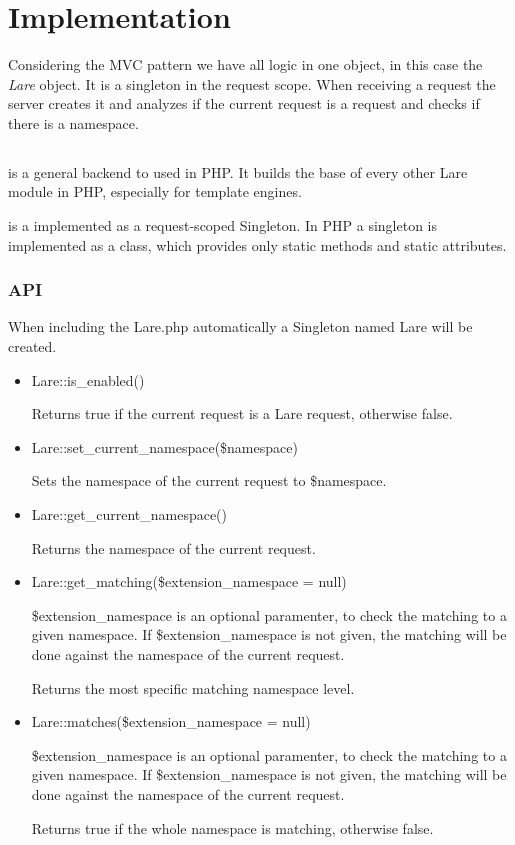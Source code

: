 \section{Implementation}

Considering the MVC pattern we have all logic in one object, in this case the \emph{Lare} object.
It is a singleton in the request scope.
When receiving a request the server creates it and analyzes if the current request is a \lare{} request and checks if there is a namespace.


\subsection{\phpLare{}}
\phpLare{} is a general \lare{} backend to used in PHP.
It builds the base of every other Lare module in PHP, especially for template engines.

\lare{} is a implemented as a request-scoped Singleton.
In PHP a singleton is implemented as a class, which provides only static methods and static attributes.

\subsubsection{API}

When including the Lare.php automatically a Singleton named Lare will be created.
\begin{itemize}
\item Lare::is\_enabled()

Returns true if the current request is a Lare request, otherwise false.
\item Lare::set\_current\_namespace(\$namespace)

Sets the namespace of the current request to \$namespace.
\item Lare::get\_current\_namespace()

Returns the namespace of the current request.
\item Lare::get\_matching(\$extension\_namespace = null)

\$extension\_namespace is an optional paramenter, to check the matching to a given namespace. If \$extension\_namespace is not given, the matching will be done against the namespace of the current request.

Returns the most specific matching namespace level.
\item Lare::matches(\$extension\_namespace = null)

\$extension\_namespace is an optional paramenter, to check the matching to a given namespace. If \$extension\_namespace is not given, the matching will be done against the namespace of the current request.

Returns true if the whole namespace is matching, otherwise false.
\end{itemize}
    
